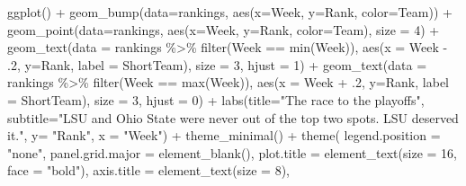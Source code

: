 \documentclass[
]{book}
\newenvironment{Shaded}{\begin{snugshade}}{\end{snugshade}}
\newcommand{\AttributeTok}[1]{\textcolor[rgb]{0.77,0.63,0.00}{#1}}
\newcommand{\DecValTok}[1]{\textcolor[rgb]{0.00,0.00,0.81}{#1}}
\newcommand{\FunctionTok}[1]{\textcolor[rgb]{0.00,0.00,0.00}{#1}}
\newcommand{\NormalTok}[1]{#1}
\newcommand{\SpecialCharTok}[1]{\textcolor[rgb]{0.00,0.00,0.00}{#1}}
\newcommand{\StringTok}[1]{\textcolor[rgb]{0.31,0.60,0.02}{#1}}
\begin{document}
\begin{Shaded}
\begin{Highlighting}[]
\FunctionTok{ggplot}\NormalTok{() }\SpecialCharTok{+} 
  \FunctionTok{geom\_bump}\NormalTok{(}\AttributeTok{data=}\NormalTok{rankings, }\FunctionTok{aes}\NormalTok{(}\AttributeTok{x=}\NormalTok{Week, }\AttributeTok{y=}\NormalTok{Rank, }\AttributeTok{color=}\NormalTok{Team)) }\SpecialCharTok{+} 
  \FunctionTok{geom\_point}\NormalTok{(}\AttributeTok{data=}\NormalTok{rankings, }\FunctionTok{aes}\NormalTok{(}\AttributeTok{x=}\NormalTok{Week, }\AttributeTok{y=}\NormalTok{Rank, }\AttributeTok{color=}\NormalTok{Team), }\AttributeTok{size =} \DecValTok{4}\NormalTok{) }\SpecialCharTok{+}   
  \FunctionTok{geom\_text}\NormalTok{(}\AttributeTok{data =}\NormalTok{ rankings }\SpecialCharTok{\%\textgreater{}\%} \FunctionTok{filter}\NormalTok{(Week }\SpecialCharTok{==} \FunctionTok{min}\NormalTok{(Week)), }\FunctionTok{aes}\NormalTok{(}\AttributeTok{x =}\NormalTok{ Week }\SpecialCharTok{{-}}\NormalTok{ .}\DecValTok{2}\NormalTok{, }\AttributeTok{y=}\NormalTok{Rank, }\AttributeTok{label =}\NormalTok{ ShortTeam), }\AttributeTok{size =} \DecValTok{3}\NormalTok{, }\AttributeTok{hjust =} \DecValTok{1}\NormalTok{) }\SpecialCharTok{+}
  \FunctionTok{geom\_text}\NormalTok{(}\AttributeTok{data =}\NormalTok{ rankings }\SpecialCharTok{\%\textgreater{}\%} \FunctionTok{filter}\NormalTok{(Week }\SpecialCharTok{==} \FunctionTok{max}\NormalTok{(Week)), }\FunctionTok{aes}\NormalTok{(}\AttributeTok{x =}\NormalTok{ Week }\SpecialCharTok{+}\NormalTok{ .}\DecValTok{2}\NormalTok{, }\AttributeTok{y=}\NormalTok{Rank, }\AttributeTok{label =}\NormalTok{ ShortTeam), }\AttributeTok{size =} \DecValTok{3}\NormalTok{, }\AttributeTok{hjust =} \DecValTok{0}\NormalTok{) }\SpecialCharTok{+}
  \FunctionTok{labs}\NormalTok{(}\AttributeTok{title=}\StringTok{"The race to the playoffs"}\NormalTok{, }\AttributeTok{subtitle=}\StringTok{"LSU and Ohio State were never out of the top two spots. LSU deserved it."}\NormalTok{, }\AttributeTok{y=} \StringTok{"Rank"}\NormalTok{, }\AttributeTok{x =} \StringTok{"Week"}\NormalTok{) }\SpecialCharTok{+}
  \FunctionTok{theme\_minimal}\NormalTok{() }\SpecialCharTok{+}
  \FunctionTok{theme}\NormalTok{(}
    \AttributeTok{legend.position =} \StringTok{"none"}\NormalTok{,}
    \AttributeTok{panel.grid.major =} \FunctionTok{element\_blank}\NormalTok{(),}
    \AttributeTok{plot.title =} \FunctionTok{element\_text}\NormalTok{(}\AttributeTok{size =} \DecValTok{16}\NormalTok{, }\AttributeTok{face =} \StringTok{"bold"}\NormalTok{),}
    \AttributeTok{axis.title =} \FunctionTok{element\_text}\NormalTok{(}\AttributeTok{size =} \DecValTok{8}\NormalTok{), }

\end{Highlighting}
\end{Shaded}
\end{document}
